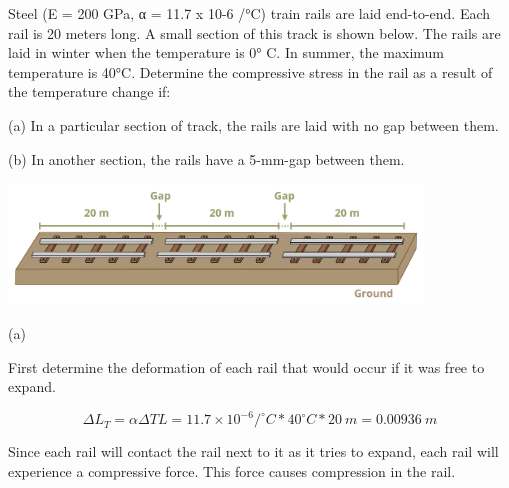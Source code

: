 \documentclass[
  letterpaper,
  DIV=11,
  numbers=noendperiod]{scrreprt}
\theoremstyle{definition}
\theoremstyle{remark}
\begin{document}
\begin{tcolorbox}[enhanced jigsaw, leftrule=.75mm, colbacktitle=quarto-callout-tip-color!10!white, breakable, opacityback=0, colback=white, titlerule=0mm, toprule=.15mm, colframe=quarto-callout-tip-color-frame, coltitle=black, title={Example 5.8: Indeterminate thermal expansion without gap. Then add gap
and rework}, toptitle=1mm, bottomrule=.15mm, rightrule=.15mm, left=2mm, arc=.35mm, opacitybacktitle=0.6, bottomtitle=1mm]

Steel (E = 200 GPa, α = 11.7 x 10-6 /°C) train rails are laid
end-to-end. Each rail is 20 meters long. A small section of this track
is shown below. The rails are laid in winter when the temperature is 0°
C. In summer, the maximum temperature is 40°C. Determine the compressive
stress in the rail as a result of the temperature change if:

(a) In a particular section of track, the rails are laid with no gap
between them.

(b) In another section, the rails have a 5-mm-gap between them.

\begin{center}
\includegraphics[width=4.33333in,height=\textheight]{images/PNGs/Example 5.8.png}
\end{center}

\begin{tcolorbox}[enhanced jigsaw, leftrule=.75mm, colbacktitle=quarto-callout-tip-color!10!white, breakable, opacityback=0, colback=white, titlerule=0mm, toprule=.15mm, colframe=quarto-callout-tip-color-frame, coltitle=black, title={Solution}, toptitle=1mm, bottomrule=.15mm, rightrule=.15mm, left=2mm, arc=.35mm, opacitybacktitle=0.6, bottomtitle=1mm]

(a)

First determine the deformation of each rail that would occur if it was
free to expand.

\[
\Delta L_T=\alpha \Delta T L=11.7 \times 10^{-6}/^\circ{C} * 40^\circ{C} * 20{~m}=0.00936{~m}
\]

Since each rail will contact the rail next to it as it tries to expand,
each rail will experience a compressive force. This force causes
compression in the rail.


\end{tcolorbox}
\end{tcolorbox}
\end{document}
